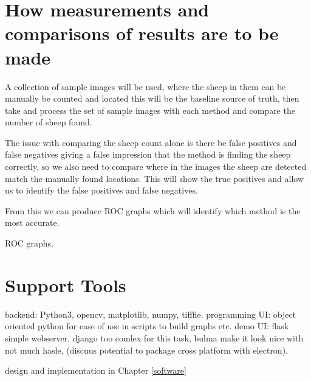 \section{How measurements and comparisons of results are to be made}
A collection of sample images will be used, where the sheep in them can be manually be counted and located this will be the baseline source of truth, then take and process the set of sample images with each method and compare the number of sheep found. 

The issue with comparing the sheep count alone is there be false positives and false negatives giving a false impression that the method is finding the sheep correctly, so we also need to compare where in the images the sheep are detected match the manually found locations. This will show the true positives and allow us to identify the false positives and false negatives.

From this we can produce ROC graphs which will identify which method is the most accurate.

ROC graphs.

\section{Support Tools}
\begin{comment}
You should also identify any support tools that you used. You should discuss your choice of implementation tools or simulation tools. For any code that you have written, you can talk about languages and related tools. For any simulation and analysis tools, identify the tools and how they are used on the project. 

For the parts of your project that need some engineering (hardware, software, firmware, or a mixture) to support the experiments, include details in your report about your design and implementation. You should discuss with your supervisor whether it is better to include a different top-level section to describe any engineering work.  In this template, Chapter 3 is suggested as a place for that discussion.
\end{comment}

backend: Python3, opencv, matplotlib, numpy, tifffle.
programming UI: object oriented python for ease of use in scripts to build graphs etc.
demo UI: flask simple webserver, django too comlex for this task, bulma make it look nice with not much hasle, (discuus potential to package cross platform with electron). 

design and implementation in Chapter \ref{software}



